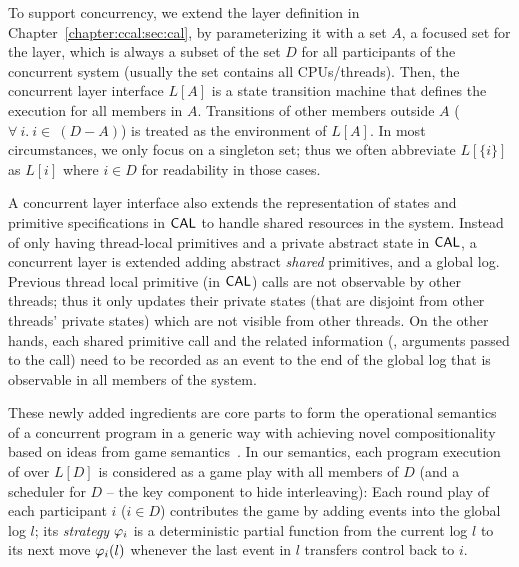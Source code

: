 To support concurrency, 
we extend the layer definition in Chapter~\ref{chapter:ccal:sec:cal},
by parameterizing it with a set $A$, 
a focused set for the layer, which is always a subset of the set $D$ for all participants of the concurrent system (usually the set contains all CPUs/threads).
Then, the concurrent layer interface $L[A]$ is a state transition machine
that defines the execution for all members in $A$. 
Transitions of other members outside $A$  ($\forall \ i . \ i \in\ (D - A)$)
is treated as the environment of $L[A]$. 
In most circumstances, we only focus on a singleton set; 
thus we often abbreviate $L[\{i\}]$ as $L[i]$ where $i\in{}D$ for readability in those cases.

A concurrent layer interface also extends the representation of states and primitive specifications in $\mathsf{CAL}$ to handle shared resources in the system. 
Instead of only having thread-local primitives and a private abstract state in $\mathsf{CAL}$, 
a concurrent layer is extended adding abstract \textit{shared} primitives, 
and a global log. 
Previous thread local primitive (in $\mathsf{CAL}$) calls are not observable by other threads; thus it only updates their private states (that are disjoint from other threads' private states) which are not visible from other threads. 
On the other hands, each shared primitive call and the related information (\ie, arguments passed to the call) 
need to be recorded as an event to the end of the global log that
is observable in all members of the system.

These newly added ingredients are core parts to form the operational semantics of a concurrent program 
 in a generic way with achieving novel compositionality based on
ideas from game semantics~\cite{gsinvite}. 
In our semantics, 
each program execution of  over 
$L[D]$ is considered as a game play with all members of $D$ 
(and a scheduler for $D$ -- the key component to hide interleaving):
Each round play of each participant $i$ ($i\in{}D$) contributes the game 
by adding events into the global log $l$; its {\em strategy}
$\varphi_{i}$ is a deterministic partial function from
the current log $l$ to its next move $\varphi_{i}(l)$ whenever
the last event in $l$ transfers control back to $i$. 

